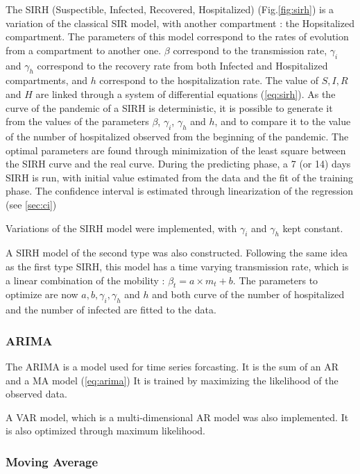 The SIRH (Suspectible, Infected, Recovered, Hospitalized) (Fig.\ref{fig:sirh}) is a variation of the classical SIR model, with another compartment : the Hopsitalized compartment. 
The parameters of this model correspond to the rates of evolution from a compartment to another one. 
$\beta$ correspond to the transmission rate, $\gamma_i$ and $\gamma_h$ correspond to the recovery rate from both Infected and Hospitalized compartments, and $h$ correspond to the hospitalization rate. 
The value of $S, I, R$ and $H$ are linked through a system of differential equations (\ref{eq:sirh}). 
As the curve of the pandemic of a SIRH is deterministic, it is possible to generate it from the values of the parameters $\beta$, $\gamma_i$, $\gamma_h$ and $h$, and to compare it to the value of the number of hospitalized observed from the beginning of the pandemic.
The optimal parameters are found through minimization of the least square between the SIRH curve and the real curve. 
During the predicting phase, a 7 (or 14) days SIRH is run, with initial value estimated from the data and the fit of the training phase.
The confidence interval is estimated through linearization of the regression (see \ref{sec:ci})

Variations of the SIRH model were implemented, with $\gamma_i$ and $\gamma_h$ kept constant. 

A SIRH model of the second type was also constructed. 
Following the same idea as the first type SIRH, this model has a time varying transmission rate, which is a linear combination of the mobility : $\beta_t = a \times m_t + b$. 
The parameters to optimize are now $a, b, \gamma_i, \gamma_h$ and $h$ and both curve of the number of hospitalized and the number of infected are fitted to the data. 


\subsubsection{ARIMA}

The ARIMA is a model used for time series forcasting. 
It is the sum of an AR and a MA model (\ref{eq:arima})
It is trained by maximizing the likelihood of the observed data. 

A VAR model, which is a multi-dimensional AR model was also implemented. 
It is also optimized through maximum likelihood. 

\subsubsection{Moving Average}

